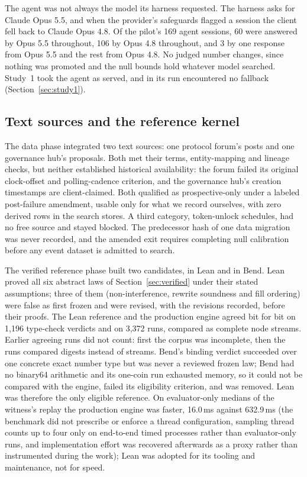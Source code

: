\documentclass[11pt]{article}
\begin{document}
The agent was not always the model its harness requested. The harness asks for Claude Opus 5.5, and when the provider's safeguards flagged a session the client fell back to Claude Opus 4.8. Of the pilot's 169 agent sessions, 60 were answered by Opus 5.5 throughout, 106 by Opus 4.8 throughout, and 3 by one response from Opus 5.5 and the rest from Opus 4.8. No judged number changes, since nothing was promoted and the null bounds hold whatever model searched. Study~1 took the agent as served, and in its run encountered no fallback (Section~\ref{sec:study1}).

\subsection{Text sources and the reference kernel}\label{sec:pilot-sources}

The data phase integrated two text sources: one protocol forum's posts and one governance hub's proposals. Both met their terms, entity-mapping and lineage checks, but neither established historical availability: the forum failed its original clock-offset and polling-cadence criterion, and the governance hub's creation timestamps are client-claimed. Both qualified as prospective-only under a labeled post-failure amendment, usable only for what we record ourselves, with zero derived rows in the search stores. A third category, token-unlock schedules, had no free source and stayed blocked. The predecessor hash of one data migration was never recorded, and the amended exit requires completing null calibration before any event dataset is admitted to search.

The verified reference phase built two candidates, in Lean and in Bend. Lean proved all six abstract laws of Section~\ref{sec:verified} under their stated assumptions; three of them (non-interference, rewrite soundness and fill ordering) were false as first frozen and were revised, with the revisions recorded, before their proofs. The Lean reference and the production engine agreed bit for bit on 1{,}196 type-check verdicts and on 3{,}372 runs, compared as complete node streams. Earlier agreeing runs did not count: first the corpus was incomplete, then the runs compared digests instead of streams. Bend's binding verdict succeeded over one concrete exact number type but was never a reviewed frozen law; Bend had no binary64 arithmetic and its one-coin run exhausted memory, so it could not be compared with the engine, failed its eligibility criterion, and was removed. Lean was therefore the only eligible reference. On evaluator-only medians of the witness's replay the production engine was faster, 16.0\,ms against 632.9\,ms (the benchmark did not prescribe or enforce a thread configuration, sampling thread counts up to four only on end-to-end timed processes rather than evaluator-only runs, and implementation effort was recovered afterwards as a proxy rather than instrumented during the work); Lean was adopted for its tooling and maintenance, not for speed.
\end{document}
